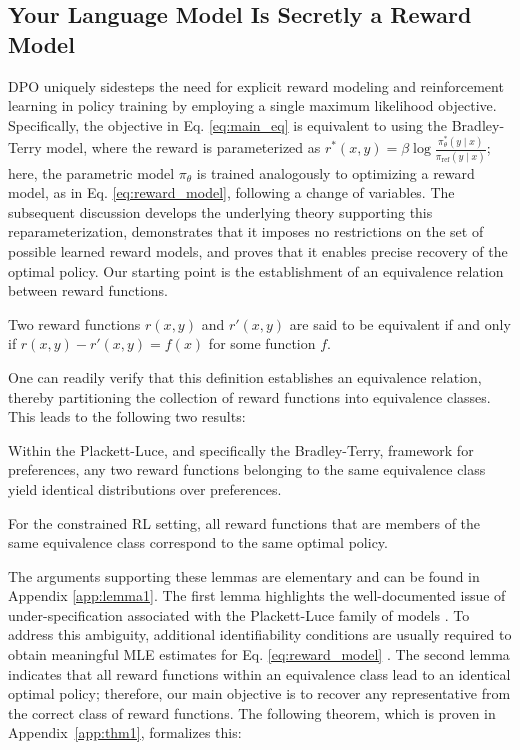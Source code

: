 \label{sec:theory}

\subsection{Your Language Model Is Secretly a Reward Model} DPO uniquely sidesteps the need for explicit reward modeling and reinforcement learning in policy training by employing a single maximum likelihood objective. Specifically, the objective in Eq. \ref{eq:main_eq} is equivalent to using the Bradley-Terry model, where the reward is parameterized as $r^*(x, y) = \beta \log\frac{\pi^*_\theta(y \mid x)}{\pi_\text{ref}(y \mid x)}$; here, the parametric model $\pi_{\theta}$ is trained analogously to optimizing a reward model, as in Eq. \ref{eq:reward_model}, following a change of variables. The subsequent discussion develops the underlying theory supporting this reparameterization, demonstrates that it imposes no restrictions on the set of possible learned reward models, and proves that it enables precise recovery of the optimal policy. Our starting point is the establishment of an equivalence relation between reward functions.

\begin{definition}
Two reward functions $r(x, y)$ and $r'(x, y)$ are said to be equivalent if and only if ${r(x, y)-r'(x, y) = f(x)}$ for some function $f$.
\end{definition}

One can readily verify that this definition establishes an equivalence relation, thereby partitioning the collection of reward functions into equivalence classes. This leads to the following two results:

\begin{lemma}\label{lemma:same_prefrence}
Within the Plackett-Luce, and specifically the Bradley-Terry, framework for preferences, any two reward functions belonging to the same equivalence class yield identical distributions over preferences.
\end{lemma}

\begin{lemma}\label{lemma:same_policy}
    For the constrained RL setting, all reward functions that are members of the same equivalence class correspond to the same optimal policy.
\end{lemma}

The arguments supporting these lemmas are elementary and can be found in Appendix \ref{app:lemma1}. The first lemma highlights the well-documented issue of under-specification associated with the Plackett-Luce family of models \cite{plackett1975analysis}. To address this ambiguity, additional identifiability conditions are usually required to obtain meaningful MLE estimates for Eq. \ref{eq:reward_model} \cite{bong2022generalized}. The second lemma indicates that all reward functions within an equivalence class lead to an identical optimal policy; therefore, our main objective is to recover any representative from the correct class of reward functions. The following theorem, which is proven in Appendix~\ref{app:thm1}, formalizes this:

